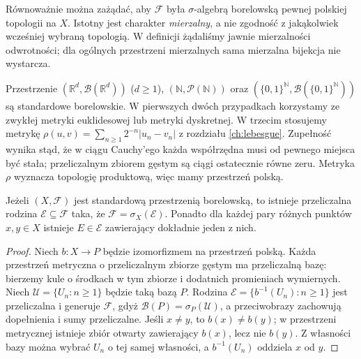 \begin{uwaga}
Równoważnie można zażądać, aby $\mathcal F$ była
$\sigma$-algebrą borelowską pewnej polskiej topologii na $X$.
Istotny jest charakter \emph{mierzalny}, a nie zgodność
z jakąkolwiek wcześniej wybraną topologią. W definicji
żądaliśmy jawnie mierzalności odwrotności; dla ogólnych
przestrzeni mierzalnych sama mierzalna bijekcja nie wystarcza.
\end{uwaga}

\begin{przyklad}
Przestrzenie $(\mathbb R^d,\mathcal B(\mathbb R^d))$
($d\ge1$), $(\mathbb N,\mathcal P(\mathbb N))$ oraz
$(\{0,1\}^{\mathbb N},\mathcal B(\{0,1\}^{\mathbb N}))$
są standardowe borelowskie. W pierwszych dwóch przypadkach
korzystamy ze zwykłej metryki euklidesowej lub metryki
dyskretnej. W trzecim stosujemy metrykę
$\rho(u,v)=\sum_{n\ge1}2^{-n}|u_n-v_n|$ z rozdziału
\ref{ch:lebesgue}. Zupełność wynika stąd, że w ciągu
Cauchy'ego każda współrzędna musi od pewnego miejsca
być stała; przeliczalnym zbiorem gęstym są ciągi
ostatecznie równe zeru. Metryka $\rho$ wyznacza topologię
produktową, więc mamy przestrzeń polską.
\end{przyklad}

\begin{twierdzenie}
\label{thm:standard-countably-generated}
Jeżeli $(X,\mathcal F)$ jest standardową przestrzenią
borelowską, to istnieje przeliczalna rodzina
$\mathcal E\subseteq\mathcal F$ taka, że
$\mathcal F=\sigma_X(\mathcal E)$. Ponadto dla
każdej pary różnych punktów $x,y\in X$ istnieje
$E\in\mathcal E$ zawierający dokładnie jeden z nich.
\end{twierdzenie}
\begin{proof}
Niech $b:X\to P$ będzie izomorfizmem na przestrzeń polską.
Każda przestrzeń metryczna o przeliczalnym zbiorze gęstym
ma przeliczalną bazę: bierzemy kule o środkach w tym zbiorze
i dodatnich promieniach wymiernych. Niech
$\mathcal U=\{U_n:n\ge1\}$ będzie taką bazą $P$.
Rodzina $\mathcal E=\{b^{-1}(U_n):n\ge1\}$
jest przeliczalna i generuje $\mathcal F$, gdyż
$\mathcal B(P)=\sigma_P(\mathcal U)$, a przeciwobrazy
zachowują dopełnienia i sumy przeliczalne.
Jeśli $x\ne y$, to $b(x)\ne b(y)$; w przestrzeni
metrycznej istnieje zbiór otwarty zawierający $b(x)$,
lecz nie $b(y)$. Z własności bazy można wybrać
$U_n$ o tej samej własności, a $b^{-1}(U_n)$
oddziela $x$ od $y$.
\end{proof}

